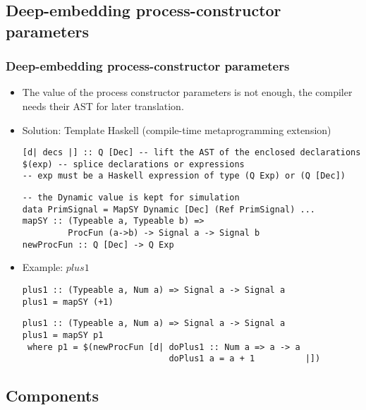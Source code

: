 \documentclass{beamer}
\begin{document}
\subsection{Deep-embedding process-constructor parameters}
\begin{frame}[fragile]
  \frametitle{Deep-embedding process-constructor parameters}
\vspace{-0.4cm}
  \begin{itemize}
  \item The value of the process constructor parameters is not enough,
    the compiler needs their AST for later translation.
    \pause
  \item Solution: Template Haskell (compile-time metaprogramming extension)
\begin{lstlisting}
[d| decs |] :: Q [Dec] -- lift the AST of the enclosed declarations 
$(exp) -- splice declarations or expressions
-- exp must be a Haskell expression of type (Q Exp) or (Q [Dec]) 
\end{lstlisting}
\pause    
\begin{lstlisting}
-- the Dynamic value is kept for simulation
data PrimSignal = MapSY Dynamic [Dec] (Ref PrimSignal) ...
mapSY :: (Typeable a, Typeable b) => 
         ProcFun (a->b) -> Signal a -> Signal b
newProcFun :: Q [Dec] -> Q Exp
\end{lstlisting} 
\item Example: $plus1$
  \pause
  \begin{overprint}
\begin{lstlisting}
plus1 :: (Typeable a, Num a) => Signal a -> Signal a
plus1 = mapSY (+1)
\end{lstlisting}
\begin{lstlisting}
plus1 :: (Typeable a, Num a) => Signal a -> Signal a 
plus1 = mapSY p1
 where p1 = $(newProcFun [d| doPlus1 :: Num a => a -> a
                             doPlus1 a = a + 1          |])
\end{lstlisting}
\end{overprint}
  \end{itemize}    
\end{frame}

\subsection{Components}
\end{document}

